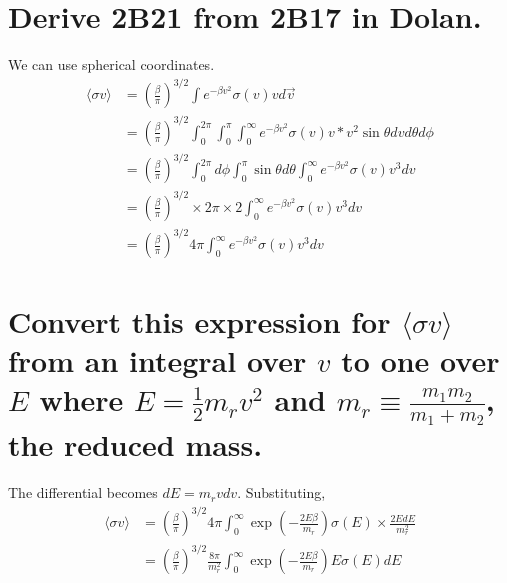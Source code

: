 \documentclass[answers]{exam}
\begin{document}
\begin{questions}

\question{}

\begin{parts}
\part{Derive 2B21 from 2B17 in Dolan.}

\begin{solution}
    We can use spherical coordinates.
    \begin{align*}
        \langle \sigma v \rangle &= \left(\frac{\beta}{\pi}\right)^{3/2} \int e^{-\beta v^2} \sigma(v)v d\vec v \\
                                 &= \left(\frac{\beta}{\pi}\right)^{3/2} \int_0^{2\pi} \int_0^\pi \int_0^\infty e^{-\beta v^2} \sigma(v) v * v^2 \sin\theta dvd\theta d\phi \\
                                 &= \left(\frac{\beta}{\pi}\right)^{3/2} \int_0^{2\pi} d\phi \int_0^\pi \sin\theta d\theta \int_0^\infty e^{-\beta v^2} \sigma(v) v^3 dv \\
                                 &= \left(\frac{\beta}{\pi}\right)^{3/2} \times 2\pi \times 2 \int_0^\infty e^{-\beta v^2} \sigma(v) v^3 dv \\
                                 &= \left(\frac{\beta}{\pi}\right)^{3/2} 4\pi \int_0^\infty e^{-\beta v^2} \sigma(v) v^3 dv
    \end{align*}
\end{solution}

\part{Convert this expression for $\langle \sigma v\rangle$ from an integral over $v$ to one over $E$ where $E = \frac{1}{2} m_rv^2$ and $m_r \equiv \frac{m_1m_2}{m_1 + m_2}$, the reduced mass.}

\begin{solution}
    The differential becomes $dE = m_rvdv$. Substituting,
    \begin{align*}
        \langle \sigma v \rangle &= \left(\frac{\beta}{\pi}\right)^{3/2} 4\pi \int_0^\infty \exp\left(-\frac{2E\beta}{m_r}\right) \sigma(E) \times \frac{2EdE}{m_r^2} \\
                                 &= \left(\frac{\beta}{\pi}\right)^{3/2} \frac{8\pi}{m_r^2} \int_0^\infty \exp\left(-\frac{2E\beta}{m_r}\right) E\sigma(E)dE
    \end{align*}
\end{solution}


\end{parts}
\end{questions}
\end{document}
